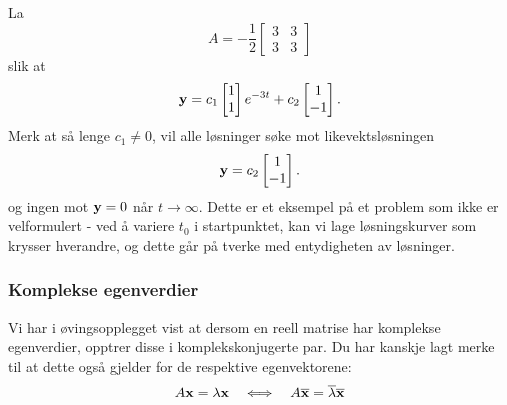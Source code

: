 \begin{ex}
La 
\[
A=-\frac{1}{2}
\begin{bmatrix}
3 & 3   \\
3 & 3
\end{bmatrix}
\]
slik at 
\[
\mathbf{y}=
c_1
\begin{bmatrix}
1  \\
1 
\end{bmatrix} e^{-3t}
+
c_2
\begin{bmatrix}
1  \\
-1 
\end{bmatrix}. 
\]
Merk at så lenge $c_1 \neq 0$, 
vil alle løsninger søke mot likevektsløsningen
\[
\mathbf{y}=
c_2
\begin{bmatrix}
1  \\
-1 
\end{bmatrix}. 
\]
og ingen mot $\mathbf{y}=0$ når $t\to \infty$.
Dette er et eksempel på et problem som ikke er velformulert - ved å variere $t_0$ i startpunktet, 
kan vi lage løsningskurver som krysser hverandre, og dette går på tverke med entydigheten av løsninger.
\end{ex}



\subsubsection*{Komplekse egenverdier}
Vi har i øvingsopplegget vist at dersom en reell matrise har komplekse egenverdier, opptrer disse i komplekskonjugerte par.
Du har kanskje lagt merke til at dette også gjelder for de respektive egenvektorene:
\[
A\mathbf{x}=\lambda \mathbf{x} \quad \Longleftrightarrow \quad A \overline {\mathbf{x}} =\overline{ \lambda} \overline {\mathbf{x}}
\]

